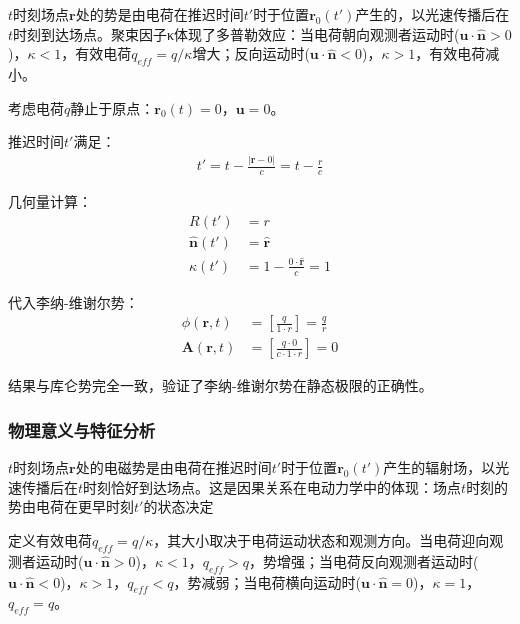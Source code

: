 \begin{derivationnote}[物理意义解释]
$t$时刻场点$\mathbf{r}$处的势是由电荷在推迟时间$t'$时于位置$\mathbf{r}_0(t')$产生的，以光速传播后在$t$时刻到达场点。聚束因子κ体现了多普勒效应：当电荷朝向观测者运动时($\mathbf{u}\cdot\hat{\mathbf{n}}>0$)，$\kappa<1$，有效电荷$q_{eff}=q/\kappa$增大；反向运动时($\mathbf{u}\cdot\hat{\mathbf{n}}<0$)，$\kappa>1$，有效电荷减小。
\end{derivationnote}

\begin{example}
考虑电荷$q$静止于原点：$\mathbf{r}_0(t) = 0$，$\mathbf{u} = 0$。

推迟时间$t'$满足：
\begin{align}
t' = t - \frac{|\mathbf{r} - 0|}{c} = t - \frac{r}{c}
\end{align}

几何量计算：
\begin{align}
R(t') &= r \\
\hat{\mathbf{n}}(t') &= \hat{\mathbf{r}} \\
\kappa(t') &= 1 - \frac{0\cdot\hat{\mathbf{r}}}{c} = 1
\end{align}

代入李纳-维谢尔势：
\begin{align}
\phi(\mathbf{r},t) &= \left[\frac{q}{1\cdot r}\right] = \frac{q}{r} \\
\mathbf{A}(\mathbf{r},t) &= \left[\frac{q\cdot 0}{c\cdot 1\cdot r}\right] = 0
\end{align}

结果与库仑势完全一致，验证了李纳-维谢尔势在静态极限的正确性。
\end{example}
\subsubsection{物理意义与特征分析}

$t$时刻场点$\mathbf{r}$处的电磁势是由电荷在推迟时间$t'$时于位置$\mathbf{r}_0(t')$产生的辐射场，以光速传播后在$t$时刻恰好到达场点。这是因果关系在电动力学中的体现：场点$t$时刻的势由电荷在更早时刻$t'$的状态决定

定义有效电荷$q_{eff} = q/\kappa$，其大小取决于电荷运动状态和观测方向。当电荷迎向观测者运动时($\mathbf{u}\cdot\hat{\mathbf{n}}>0$)，$\kappa<1$，$q_{eff}>q$，势增强；当电荷反向观测者运动时($\mathbf{u}\cdot\hat{\mathbf{n}}<0$)，$\kappa>1$，$q_{eff}<q$，势减弱；当电荷横向运动时($\mathbf{u}\cdot\hat{\mathbf{n}}=0$)，$\kappa=1$，$q_{eff}=q$。

